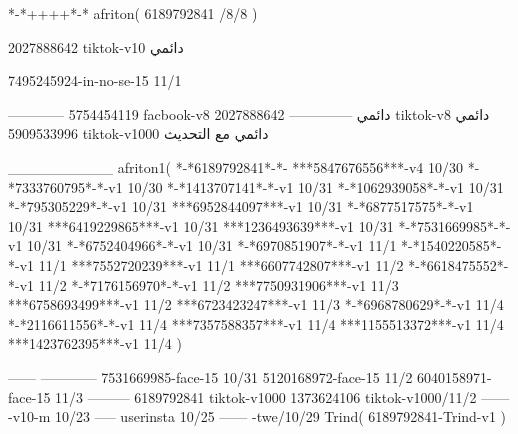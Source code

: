 *-*++++*-*
afriton(
6189792841 /8/8
)

2027888642 tiktok-v10
دائمي


7495245924-in-no-se-15 11/1

------------
5754454119 facbook-v8
دائمي
--------------
2027888642 tiktok-v8
دائمي
5909533996 tiktok-v1000
دائمي مع التحديث

__________
afriton1(
*-*6189792841*-*-
***5847676556***-v4 10/30
*-*7333760795*-*-v1 10/30
*-*1413707141*-*-v1 10/31
*-*1062939058*-*-v1 10/31
*-*795305229*-*-v1 10/31
***6952844097***-v1 10/31
*-*6877517575*-*-v1 10/31
***6419229865***-v1 10/31
***1236493639***-v1 10/31
*-*7531669985*-*-v1 10/31
*-*6752404966*-*-v1 10/31
*-*6970851907*-*-v1 11/1
*-*1540220585*-*-v1 11/1
***7552720239***-v1 11/1
***6607742807***-v1 11/2
*-*6618475552*-*-v1 11/2
*-*7176156970*-*-v1 11/2
***7750931906***-v1 11/3
***6758693499***-v1 11/2
***6723423247***-v1 11/3
*-*6968780629*-*-v1 11/4
*-*2116611556*-*-v1 11/4
***7357588357***-v1 11/4
***1155513372***-v1 11/4
***1423762395***-v1 11/4
)

------
------------
7531669985-face-15 10/31
5120168972-face-15 11/2
6040158971-face-15 11/3
---------
6189792841 tiktok-v1000
1373624106 tiktok-v1000/11/2
------
-v10-m 10/23
-----
userinsta 10/25
------
-twe/10/29
Trind(
6189792841-Trind-v1 
)
